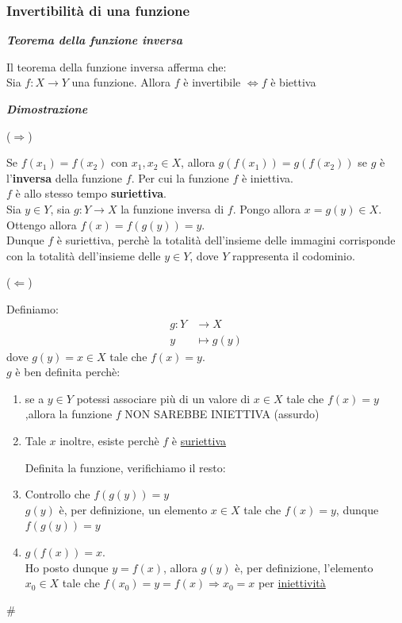 \documentclass{article}
\theoremstyle{definition}
\begin{document}
\subsubsection{Invertibilità di una funzione}
\begin{center}
    \textbf{\textit{Teorema della funzione inversa}}
\end{center}
Il teorema della funzione inversa afferma che:
\\
Sia $f: X \rightarrow Y$ una funzione. Allora $f$ è invertibile $\Longleftrightarrow f$ è biettiva
\begin{center}
    \textbf{\textit{Dimostrazione}}
\end{center}
\begin{center}
    ($\Longrightarrow$)
\end{center}
Se $f(x_1)=f(x_2)$ con $x_1,x_2 \in X$, allora $g(f(x_1))=g(f(x_2))$ se $g$ è l'\textbf{inversa} della funzione $f$. Per cui la funzione $f$ è iniettiva.
\\
$f$ è allo stesso tempo \textbf{suriettiva}.
\\ Sia $y \in Y$, sia $g: Y \to X$ la funzione inversa di $f$.
Pongo allora $x=g(y) \in X$.
\\Ottengo allora $f(x)=f(g(y))=y$.
\\ Dunque $f$ è suriettiva, perchè la totalità dell'insieme delle immagini corrisponde con la totalità dell'insieme delle $y \in Y$, dove $Y$ rappresenta il codominio.
\begin{center}
    ($\Longleftarrow$)
\end{center}
Definiamo:
\begin{align*}
g \colon Y &\to X \\
y &\mapsto g(y)
\end{align*}
dove $g(y)= x \in X$ tale che $f(x)=y$.
\\
$g$ è ben definita perchè:
\begin{enumerate}
    \item se a $y \in Y$ potessi associare più di un valore di $x \in X$ tale che $f(x)=y$ ,allora la funzione $f$ NON SAREBBE INIETTIVA (assurdo)
    \item Tale $x$ inoltre, esiste perchè $f$ è \underline{suriettiva}
    \begin{center}
       Definita la funzione, verifichiamo il resto:
    \end{center}
    \item Controllo che $f(g(y))=y$
    \\ $g(y)$ è, per definizione, un elemento $x \in X$ tale che $f(x)=y$, dunque $f(g(y))=y$
    \item $g(f(x))=x$.
    \\ Ho posto dunque $y=f(x)$, allora $g(y)$ è, per definizione, l'elemento $x_0 \in X$ tale che $f(x_0)=y=f(x) \Longrightarrow x_0=x$ per \underline{iniettività}
\end{enumerate}
\begin{center}
    \#
\end{center}
\end{document}
